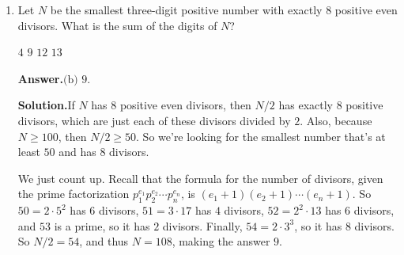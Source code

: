 \documentclass[11pt,paper=letter]{scrartcl}
\newcommand{\ans}{{\sffamily \bfseries Answer.}\;}
\newcommand{\ansb}[2]{\ans\(\boxed{\text{(#1) #2}}\).}
\newcommand{\sol}{{\sffamily \bfseries Solution.}\;}
\newenvironment{rem}%
{\noindent \ignorespaces \small \sffamily \sansmath {\bfseries Remark.}}%
{\ignorespacesafterend}
\begin{document}
\begin{enumerate}[left=0pt]
\fourch
{$8$}
{$14$}
{$11$}
{$10$}

\ansb{a}{$8$}

\sol If the other leg had length $b$, and the hypotenuse had length $c$, then by the Pythagorean theorem, $17^2 + b^2 = c^2$. Using the difference of two squares, $289 = (c - b)(c + b)$.

As $b$ and $c$ are positive integers, $c-b$ and $c+b$ are also integers, and $c-b$ is smaller than $c+b$. The only way to write $289$ as the product of two positive integers, one smaller than the other, is $1 \times 289$. So we set $c - b = 1$ and $c + b = 289$, and then we can solve for $b = 144$ and $c = 145$.

Finally, it's well-known that the inradius of a right triangle is $\dfrac{a + b - c}{2}$, where $a$ and $b$ are the lengths of its legs and $c$ is the length of its hypotenuse. So the answer is $\dfrac{17 + 144 - 145}{2} = 8$.

\begin{rem}
To prove the formula for the inradius, consider that the area is both $\frac{1}{2}ab$ and the inradius times the semiperimeter, $\frac{1}{2}(a + b + c)$. So the inradius is the area divided by the semiperimeter, meaning it is $\frac{ab}{a + b + c}$. This can be simplified as $\frac{ab}{a + b + c} \cdot \frac{a + b - c}{a + b - c} = \frac{ab(a + b - c)}{(a + b)^2 - c^2} = \frac{ab(a + b - c)}{(a^2 + b^2 - c^2) + 2ab} = \frac{a + b - c}{2}.$
\end{rem}

\item Let $N$ be the smallest three-digit positive number with exactly $8$ positive even divisors. What is the sum of the digits of $N$?

\fourch
{$4$}
{$9$}
{$12$}
{$13$}

\ansb{b}{$9$}

\sol If $N$ has $8$ positive even divisors, then $N/2$ has exactly $8$ positive divisors, which are just each of these divisors divided by $2$. Also, because $N \ge 100$, then $N/2 \ge 50$. So we're looking for the smallest number that's at least $50$ and has $8$ divisors.

We just count up. Recall that the formula for the number of divisors, given the prime factorization $p_1^{e_1}p_2^{e_2} \cdots p_n^{e_n}$, is $(e_1 + 1)(e_2 + 1) \cdots (e_n + 1)$. So $50 = 2 \cdot 5^2$ has $6$ divisors, $51 = 3 \cdot 17$ has $4$ divisors, $52 = 2^2 \cdot 13$ has $6$ divisors, and $53$ is a prime, so it has $2$ divisors. Finally, $54 = 2 \cdot 3^3$, so it has $8$ divisors. So $N/2 = 54$, and thus $N = 108$, making the answer $9$.


\end{enumerate}
\end{document}
